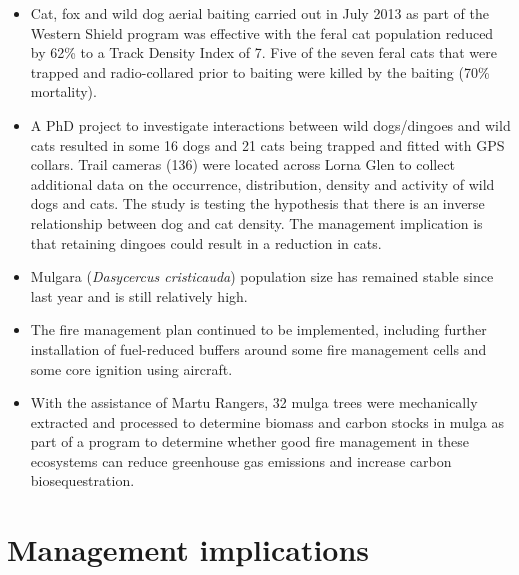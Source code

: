 \documentclass[version=last,
    paper=a4, %
    10pt, %
    usenames,
    dvipsnames,
    oneside, %
    headings=openany, %
    DIV=15 %
]{scrbook}
\begin{document}
\begin{itemize}
\itemsep1pt\parskip0pt
\item
  Cat, fox and wild dog aerial baiting carried out in July 2013 as part
  of the Western Shield program was effective with the feral cat
  population reduced by 62\% to a Track Density Index of 7. Five of the
  seven feral cats that were trapped and radio-collared prior to baiting
  were killed by the baiting (70\% mortality).
\item
  A PhD project to investigate interactions between wild dogs/dingoes
  and wild cats resulted in some 16 dogs and 21 cats being trapped and
  fitted with GPS collars. Trail cameras (136) were located across Lorna
  Glen to collect additional data on the occurrence, distribution,
  density and activity of wild dogs and cats. The study is testing the
  hypothesis that there is an inverse relationship between dog and cat
  density. The management implication is that retaining dingoes could
  result in a reduction in cats.
\item
  Mulgara (\emph{Dasycercus cristicauda}) population size has remained
  stable since last year and is still relatively high.
\item
  The fire management plan continued to be implemented, including
  further installation of fuel-reduced buffers around some fire
  management cells and some core ignition using aircraft.
\item
  With the assistance of Martu Rangers, 32 mulga trees were mechanically
  extracted and processed to determine biomass and carbon stocks in
  mulga as part of a program to determine whether good fire management
  in these ecosystems can reduce greenhouse gas emissions and increase
  carbon biosequestration.
\end{itemize}




\section*{Management implications}
\end{document}
